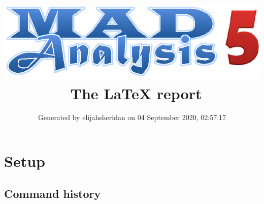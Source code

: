 \documentclass[a4paper, 10pt]{article}
\title{{\includegraphics[scale=.4]{logo.eps}}\ The LaTeX report}
\author{Generated by elijahsheridan on 04 September 2020, 02:57:17}
\begin{document}
\maketitle
\flushbottom

\newpage
\section{ Setup}

\subsection{ Command history}
\end{document}
